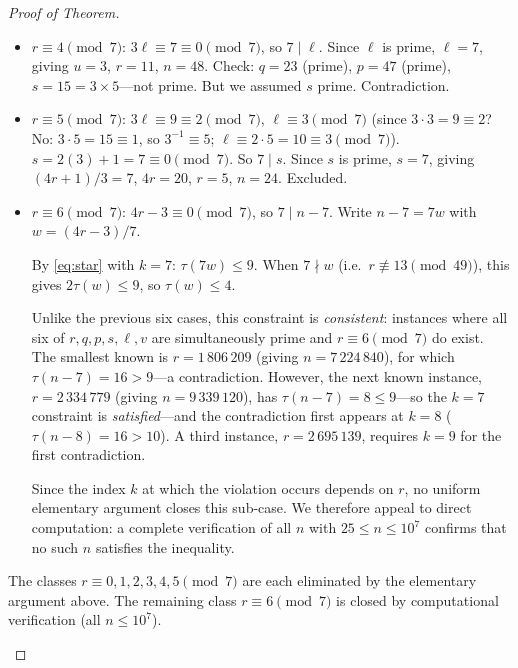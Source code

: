 \documentclass[11pt]{article}
\begin{document}
\begin{proof}[Proof of Theorem]
\begin{itemize}
\begin{itemize}
\begin{itemize}
      So $7 \mid q$.  Since $q$ is prime, $q = 7$.  Then
      $n - 2 = 14$, $n = 16$, but $n > 24$.  Contradiction.
    \item $r \equiv 4 \pmod 7$: $3\ell \equiv 7 \equiv 0 \pmod 7$, so
      $7 \mid \ell$.  Since $\ell$ is prime, $\ell = 7$, giving
      $u = 3$, $r = 11$, $n = 48$.  Check: $q = 23$ (prime), $p = 47$
      (prime), $s = 15 = 3 \times 5$---not prime.
      But we assumed $s$ prime.  Contradiction.
    \item $r \equiv 5 \pmod 7$: $3\ell \equiv 9 \equiv 2 \pmod 7$,
      $\ell \equiv 3 \pmod 7$ (since $3 \cdot 3 = 9 \equiv 2$? No:
      $3 \cdot 5 = 15 \equiv 1$, so $3^{-1} \equiv 5$; $\ell \equiv 2 \cdot 5
      = 10 \equiv 3 \pmod 7$).
      $s = 2(3)+1=7 \equiv 0 \pmod 7$.  So $7 \mid s$.
      Since $s$ is prime, $s = 7$, giving $(4r+1)/3 = 7$, $4r = 20$,
      $r = 5$, $n = 24$.  Excluded.
    \item $r \equiv 6 \pmod 7$: $4r - 3 \equiv 0 \pmod 7$,
      so $7 \mid n - 7$.  Write $n - 7 = 7w$ with $w = (4r-3)/7$.

      By \eqref{eq:star} with $k = 7$: $\tau(7w) \le 9$.
      When $7 \nmid w$ (i.e.\ $r \not\equiv 13 \pmod{49}$),
      this gives $2\tau(w) \le 9$, so $\tau(w) \le 4$.

      Unlike the previous six cases, this constraint is \emph{consistent}:
      instances where all six of $r, q, p, s, \ell, v$ are simultaneously
      prime and $r \equiv 6 \pmod 7$ do exist.  The smallest known is
      $r = 1\,806\,209$ (giving $n = 7\,224\,840$), for which
      $\tau(n-7) = 16 > 9$---a contradiction.  However, the next known
      instance, $r = 2\,334\,779$ (giving $n = 9\,339\,120$), has
      $\tau(n-7) = 8 \le 9$---so the $k = 7$ constraint is
      \emph{satisfied}---and the contradiction first appears at $k = 8$
      ($\tau(n-8) = 16 > 10$).  A third instance, $r = 2\,695\,139$,
      requires $k = 9$ for the first contradiction.

      Since the index $k$ at which the violation occurs depends on $r$,
      no uniform elementary argument closes this sub-case.  We therefore
      appeal to direct computation: a complete verification of all $n$
      with $25 \le n \le 10^7$ confirms that no such $n$ satisfies the
      inequality.
    \end{itemize}

    The classes $r \equiv 0,1,2,3,4,5 \pmod 7$ are each eliminated by
    the elementary argument above.  The remaining class $r \equiv 6 \pmod 7$
    is closed by computational verification (all $n \le 10^7$).


\end{itemize}
\end{itemize}
\end{proof}
\end{document}
